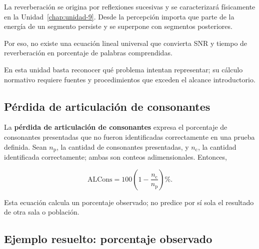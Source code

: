 La reverberación se origina por reflexiones sucesivas y se caracterizará
físicamente en la Unidad~\ref{chap:unidad-9}. Desde la percepción importa que
parte de la energía
de un segmento persiste y se superpone con segmentos posteriores.

 Por eso, no existe una ecuación
lineal universal que convierta SNR y tiempo de reverberación en porcentaje de
palabras comprendidas.

 En esta unidad basta reconocer qué problema intentan
representar; su cálculo normativo requiere fuentes y procedimientos que
exceden el alcance introductorio.

\subsection{Pérdida de articulación de consonantes}
\label{sec:u7-alcons}

La \textbf{pérdida de articulación de consonantes} expresa el porcentaje de
consonantes presentadas que no fueron identificadas correctamente en una
prueba definida. Sean \(n_\mathrm{p}\), la cantidad de consonantes
presentadas, y \(n_\mathrm{c}\), la cantidad identificada correctamente; ambas
son conteos adimensionales. Entonces,

\begin{equation}
    \mathrm{ALCons}
      =100\left(1-\frac{n_\mathrm{c}}{n_\mathrm{p}}\right)\%.
    \label{eq:u7-alcons}
\end{equation}

Esta ecuación calcula un porcentaje observado; no predice por sí sola el
resultado de otra sala o población. 

\subsection{Ejemplo resuelto: porcentaje observado}
\label{sec:u7-ejemplo-alcons}

